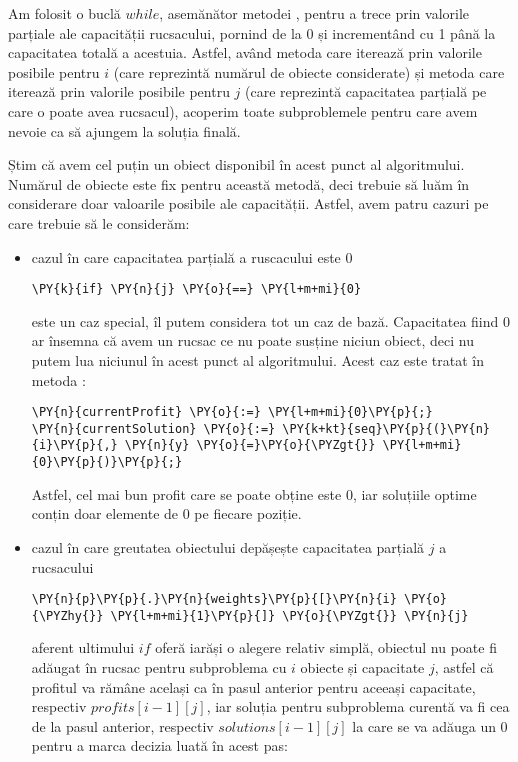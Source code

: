 \begin{sloppypar}
    Am folosit o buclă $while$, asemănător metodei , pentru a trece prin valorile parțiale ale capacității rucsacului, pornind de la 0 și incrementând cu 1 până la capacitatea totală a acestuia. Astfel, având metoda  care iterează prin valorile posibile pentru $i$ (care reprezintă numărul de obiecte considerate) și metoda  care iterează prin valorile posibile pentru $j$ (care reprezintă capacitatea parțială pe care o poate avea rucsacul), acoperim toate subproblemele pentru care avem nevoie ca să ajungem la soluția finală. \par
    Știm că avem cel puțin un obiect disponibil în acest punct al algoritmului. Numărul de obiecte este fix pentru această metodă, deci trebuie să luăm în considerare doar valoarile posibile ale capacității. Astfel, avem patru cazuri pe care trebuie să le considerăm:
    \begin{itemize}
        \item cazul în care capacitatea parțială a ruscacului este 0
        \begin{Verbatim}[commandchars=\\\{\}]
                        \PY{k}{if} \PY{n}{j} \PY{o}{==} \PY{l+m+mi}{0}
\end{Verbatim}
        este un caz special, îl putem considera tot un caz de bază. Capacitatea fiind 0 ar însemna că avem un rucsac ce nu poate susține niciun obiect, deci nu putem lua niciunul în acest punct al algoritmului. Acest caz este tratat în metoda :
        \begin{Verbatim}[commandchars=\\\{\}]
\PY{n}{currentProfit} \PY{o}{:=} \PY{l+m+mi}{0}\PY{p}{;}
\PY{n}{currentSolution} \PY{o}{:=} \PY{k+kt}{seq}\PY{p}{(}\PY{n}{i}\PY{p}{,} \PY{n}{y} \PY{o}{=}\PY{o}{\PYZgt{}} \PY{l+m+mi}{0}\PY{p}{)}\PY{p}{;}
\end{Verbatim}
        Astfel, cel mai bun profit care se poate obține este 0, iar soluțiile optime conțin doar elemente de 0 pe fiecare poziție.
        \item cazul în care greutatea obiectului depășește capacitatea parțială $j$ a rucsacului
        \begin{Verbatim}[commandchars=\\\{\}]
                    \PY{n}{p}\PY{p}{.}\PY{n}{weights}\PY{p}{[}\PY{n}{i} \PY{o}{\PYZhy{}} \PY{l+m+mi}{1}\PY{p}{]} \PY{o}{\PYZgt{}} \PY{n}{j}
\end{Verbatim}
        aferent ultimului $if$ oferă iarăși o alegere relativ simplă, obiectul nu poate fi adăugat în rucsac pentru subproblema cu $i$ obiecte și capacitate $j$, astfel că profitul va rămâne același ca în pasul anterior pentru aceeași capacitate, respectiv $profits[i - 1][j]$, iar soluția pentru subproblema curentă va fi cea de la pasul anterior, respectiv $solutions[i - 1][j]$ la care se va adăuga un 0 pentru a marca decizia luată în acest pas:

\end{itemize}
\end{sloppypar}
